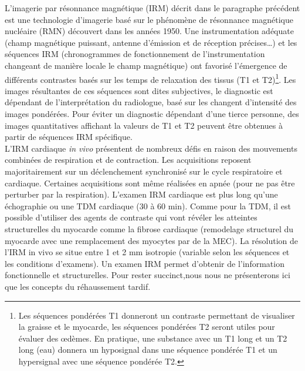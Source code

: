 

L’imagerie par résonnance magnétique (IRM) décrit dans le paragraphe précédent est une technologie d’imagerie basé sur le phénomène de résonnance magnétique nucléaire (RMN) découvert dans les années 1950.  Une instrumentation adéquate (champ magnétique puissant, antenne d’émission et de réception précises…) et les séquences IRM (chronogrammes de fonctionnement de l’instrumentation changeant de manière locale le champ magnétique) ont favorisé l’émergence de différents contrastes basés sur les temps de relaxation des tissus (T1 et T2)\footnote{Les séquences pondérées T1 donneront un contraste permettant de visualiser la graisse et le myocarde, les séquences pondérées T2 seront utiles pour évaluer des œdèmes. En pratique, une substance avec un T1 long et un T2 long (eau) donnera un hyposignal dans une séquence pondérée T1 et un hypersignal avec une séquence pondérée T2.}. Les images résultantes de ces séquences sont dites subjectives, le diagnostic est dépendant de l’interprétation du radiologue, basé sur les changent d’intensité des images pondérées. Pour éviter un diagnostic dépendant d’une tierce personne, des images quantitatives affichant la valeurs de T1 et T2 peuvent être obtenues à partir de séquences IRM spécifique. \\




L’IRM cardiaque \textit{in vivo} présentent de nombreux défis en raison des mouvements combinées de respiration et de contraction. Les acquisitions reposent majoritairement sur un déclenchement synchronisé sur le cycle respiratoire et cardiaque. Certaines acquisitions sont même réalisées en apnée (pour ne pas être perturber par la respiration). L'examen IRM cardiaque est plus long qu’une échographie ou une TDM cardiaque (30 à 60 min). Comme pour la TDM, il est possible d’utiliser des agents de contraste qui vont révéler les atteintes structurelles du myocarde comme la fibrose cardiaque (remodelage structurel du myocarde avec une remplacement des myocytes par de la MEC). La résolution de l’IRM in vivo se situe entre 1 et 2 mm isotropie (variable selon les séquences et les conditions d’examens). Un examen IRM permet d'obtenir de l'information fonctionnelle et structurelles. Pour rester succinct,nous nous ne présenterons ici que les concepts du réhaussement tardif. 

